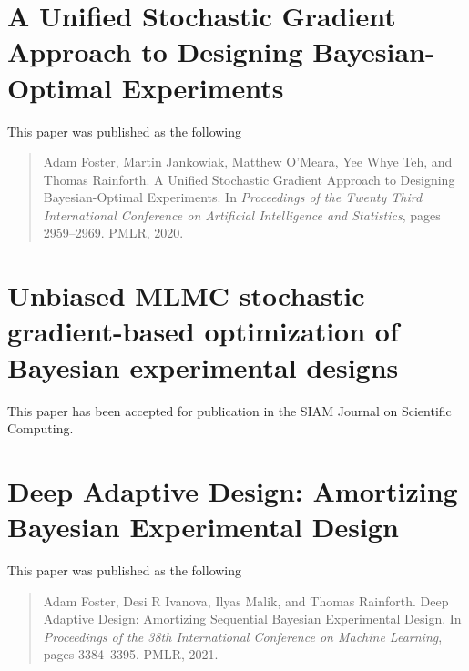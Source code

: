 \documentclass[a4paper, 10pt]{report}
\theoremstyle{plain}
\begin{document}
	
	
	
	
	\chapter{A Unified Stochastic Gradient Approach to Designing Bayesian-Optimal Experiments}
	\label{chap:sgboed}
	This paper was published as the following
	\begin{quote}
		Adam Foster, Martin Jankowiak, Matthew O'Meara, Yee Whye Teh, and Thomas Rainforth. A Unified Stochastic Gradient Approach to Designing Bayesian-Optimal Experiments.  In \emph{Proceedings of the Twenty Third International Conference on Artificial Intelligence and Statistics}, pages 2959--2969. PMLR, 2020.
	\end{quote}
	
	
	
	\chapter{Unbiased MLMC stochastic gradient-based optimization of Bayesian experimental designs}
	\label{chap:mlmc}
	This paper has been accepted for publication in the SIAM Journal on Scientific Computing.
	
	
	
	\chapter{Deep Adaptive Design: Amortizing Bayesian Experimental Design}
	\label{chap:dad}
	This paper was published as the following
	\begin{quote}
		Adam Foster, Desi R Ivanova, Ilyas Malik, and Thomas Rainforth. Deep Adaptive Design: Amortizing Sequential Bayesian Experimental Design. In \emph{Proceedings of the 38th International Conference on Machine Learning}, pages 3384--3395. PMLR, 2021.
	\end{quote}
	
	
	
\end{document}
